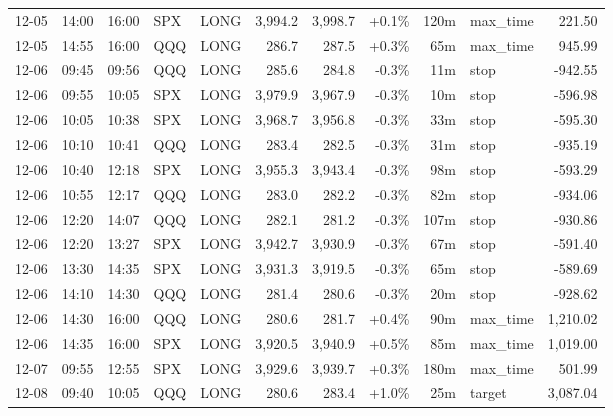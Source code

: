 \documentclass[11pt,a4paper,twoside]{article}
\begin{document}
\begin{center}
\begin{longtable}{>{\color{txtmain}}l l l l l r r r r >{\color{txtmain}}l r}
12-05 & 14:00 & 16:00 & SPX & LONG & 3,994.2 & 3,998.7 & \textcolor{wingreen}{+0.1\%} & 120m & max\_time & \textcolor{wingreen}{221.50} \\
12-05 & 14:55 & 16:00 & QQQ & LONG & 286.7 & 287.5 & \textcolor{wingreen}{+0.3\%} & 65m & max\_time & \textcolor{wingreen}{945.99} \\
12-06 & 09:45 & 09:56 & QQQ & LONG & 285.6 & 284.8 & \textcolor{lossred}{-0.3\%} & 11m & stop & \textcolor{lossred}{-942.55} \\
12-06 & 09:55 & 10:05 & SPX & LONG & 3,979.9 & 3,967.9 & \textcolor{lossred}{-0.3\%} & 10m & stop & \textcolor{lossred}{-596.98} \\
12-06 & 10:05 & 10:38 & SPX & LONG & 3,968.7 & 3,956.8 & \textcolor{lossred}{-0.3\%} & 33m & stop & \textcolor{lossred}{-595.30} \\
12-06 & 10:10 & 10:41 & QQQ & LONG & 283.4 & 282.5 & \textcolor{lossred}{-0.3\%} & 31m & stop & \textcolor{lossred}{-935.19} \\
12-06 & 10:40 & 12:18 & SPX & LONG & 3,955.3 & 3,943.4 & \textcolor{lossred}{-0.3\%} & 98m & stop & \textcolor{lossred}{-593.29} \\
12-06 & 10:55 & 12:17 & QQQ & LONG & 283.0 & 282.2 & \textcolor{lossred}{-0.3\%} & 82m & stop & \textcolor{lossred}{-934.06} \\
12-06 & 12:20 & 14:07 & QQQ & LONG & 282.1 & 281.2 & \textcolor{lossred}{-0.3\%} & 107m & stop & \textcolor{lossred}{-930.86} \\
12-06 & 12:20 & 13:27 & SPX & LONG & 3,942.7 & 3,930.9 & \textcolor{lossred}{-0.3\%} & 67m & stop & \textcolor{lossred}{-591.40} \\
12-06 & 13:30 & 14:35 & SPX & LONG & 3,931.3 & 3,919.5 & \textcolor{lossred}{-0.3\%} & 65m & stop & \textcolor{lossred}{-589.69} \\
12-06 & 14:10 & 14:30 & QQQ & LONG & 281.4 & 280.6 & \textcolor{lossred}{-0.3\%} & 20m & stop & \textcolor{lossred}{-928.62} \\
12-06 & 14:30 & 16:00 & QQQ & LONG & 280.6 & 281.7 & \textcolor{wingreen}{+0.4\%} & 90m & max\_time & \textcolor{wingreen}{1,210.02} \\
12-06 & 14:35 & 16:00 & SPX & LONG & 3,920.5 & 3,940.9 & \textcolor{wingreen}{+0.5\%} & 85m & max\_time & \textcolor{wingreen}{1,019.00} \\
12-07 & 09:55 & 12:55 & SPX & LONG & 3,929.6 & 3,939.7 & \textcolor{wingreen}{+0.3\%} & 180m & max\_time & \textcolor{wingreen}{501.99} \\
12-08 & 09:40 & 10:05 & QQQ & LONG & 280.6 & 283.4 & \textcolor{wingreen}{+1.0\%} & 25m & target & \textcolor{wingreen}{3,087.04} \\

\end{longtable}
\end{center}
\end{document}

